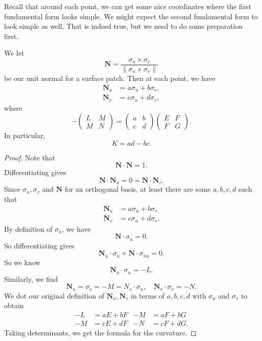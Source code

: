 \documentclass[a4paper]{article}
\begin{document}
Recall that around each point, we can get some nice coordinates where the first fundamental form looks simple. We might expect the second fundamental form to look simple as well. That is indeed true, but we need to do some preparation first.
\begin{prop}
  We let
  \[
    \mathbf{N} = \frac{\sigma_u \times \sigma_v}{\|\sigma_u \times \sigma_v\|}
  \]
  be our unit normal for a surface patch. Then at each point, we have
  \begin{align*}
    \mathbf{N}_u &= a \sigma_u + b \sigma_v,\\
    \mathbf{N}_v &= c \sigma_u + d \sigma_v,
  \end{align*}
  where
  \[
    -
    \begin{pmatrix}
      L & M\\
      M & N
    \end{pmatrix}=
    \begin{pmatrix}
      a & b\\
      c & d
    \end{pmatrix}
    \begin{pmatrix}
      E & F\\
      F & G
    \end{pmatrix}.
  \]
  In particular,
  \[
    K = ad - bc.
  \]
\end{prop}

\begin{proof}
  Note that
  \[
    \mathbf{N} \cdot \mathbf{N} = 1.
  \]
  Differentiating gives
  \[
    \mathbf{N}\cdot \mathbf{N}_u = 0 = \mathbf{N}\cdot \mathbf{N}_v.
  \]
  Since $\sigma_u, \sigma_v$ and $\mathbf{N}$ for an orthogonal basis, at least there are some $a, b, c, d$ such that
  \begin{align*}
    \mathbf{N}_u &= a \sigma_u + b \sigma_v\\
    \mathbf{N}_v &= c \sigma_u + d \sigma_v.
  \end{align*}
  By definition of $\sigma_u$, we have
  \[
    \mathbf{N}\cdot \sigma_u = 0.
  \]
  So differentiating gives
  \[
    \mathbf{N}_u \cdot \sigma_u + \mathbf{N}\cdot \sigma_{uu} = 0.
  \]
  So we know
  \[
    \mathbf{N}_u \cdot \sigma_u = -L.
  \]
  Similarly, we find
  \[
    \mathbf{N}_u = \sigma_v = -M = N_v \cdot \sigma_u,\quad \mathbf{N}_v \cdot \sigma_v = -N.
  \]
  We dot our original definition of $\mathbf{N}_u, \mathbf{N}_v$ in terms of $a, b, c, d$ with $\sigma_u$ and $\sigma_v$ to obtain
  \begin{align*}
    -L &= aE + bF & -M &= aF + bG\\
    -M &= cE + dF & -N &= cF + dG.
  \end{align*}
  Taking determinants, we get the formula for the curvature.
\end{proof}
\end{document}
